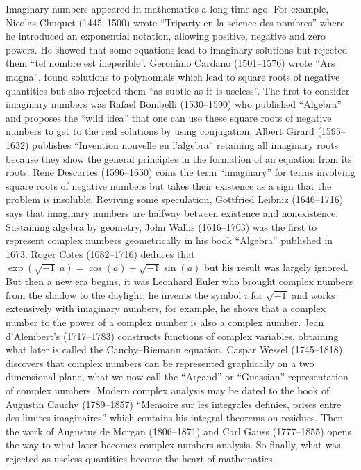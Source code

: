 \documentclass[a4paper,12pt]{book}
\begin{document}
Imaginary numbers appeared in mathematics a long time ago. For example,
Nicolas Chuquet (1445--1500) wrote ``Triparty en la science des nombres''
where he introduced an exponential notation, allowing positive, negative and
zero powers. He showed that some equations lead to imaginary solutions but
rejected them ``tel nombre est ineperible''. Geronimo Cardano (1501--1576)
wrote ``Ars magna'', found solutions to polynomials which lead to square
roots of negative quantities but also rejected them ``as subtle as it is
useless''. The first to consider imaginary numbers was Rafael Bombelli
(1530--1590) who published ``Algebra'' and proposes the ``wild idea'' that
one can use these square roots of negative numbers to get to the real
solutions by using conjugation. Albert Girard (1595--1632) publishes
``Invention nouvelle en l'algebra'' retaining all imaginary roots because
they show the general principles in the formation of an equation from its
roots. Rene Descartes (1596--1650) coins the term ``imaginary'' for terms
involving square roots of negative numbers but takes their existence as a
sign that the problem is insoluble. Reviving some speculation, Gottfried
Leibniz (1646--1716) says that imaginary numbers are halfway between
existence and nonexistence. Sustaining algebra by geometry, John Wallis
(1616--1703) was the first to represent complex numbers geometrically in his
book ``Algebra'' published in 1673. Roger Cotes (1682--1716) deduces that $%
\exp \left( \sqrt{-1}\;a\right) =\cos \left( a\right) +\sqrt{-1}\sin \left(
a\right) $ but his result was largely ignored. But then a new era begins, it
was Leonhard Euler who brought complex numbers from the shadow to the
daylight, he invents the symbol $i$ for $\sqrt{-1}$ and works extensively
with imaginary numbers, for example, he shows that a complex number to the
power of a complex number is also a complex number. Jean d'Alembert's
(1717--1783) constructs functions of complex variables, obtaining what later
is called the Cauchy--Riemann equation. Caspar Wessel (1745--1818) discovers
that complex numbers can be represented graphically on a two dimensional
plane, what we now call the ``Argand'' or ``Guassian'' representation of
complex numbers. Modern complex analysis may be dated to the book of
Augustin Cauchy (1789--1857) ``Memoire sur les integrales definies, prises
entre des limites imaginaires'' which contains his integral theorems on
residues. Then the work of Augustus de Morgan (1806--1871) and Carl Gauss
(1777--1855) opens the way to what later becomes complex numbers analysis.
So finally, what was rejected as useless quantities become the heart of
mathematics.
\end{document}

